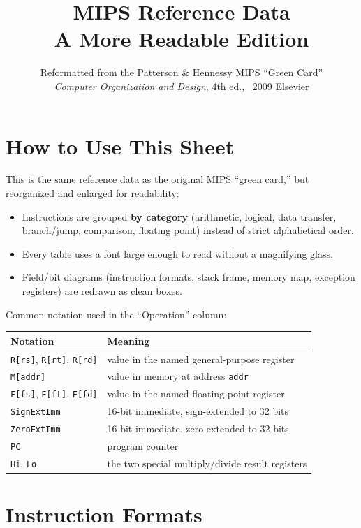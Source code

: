 \documentclass[10pt]{article}
\title{\bfseries MIPS Reference Data\\[2pt]\large A More Readable Edition}
\author{Reformatted from the Patterson \& Hennessy MIPS ``Green Card''\\
\emph{Computer Organization and Design}, 4th ed., \textcopyright\ 2009 Elsevier}
\date{}
\newcommand{\op}[1]{\texttt{#1}}
\begin{document}
\maketitle
\tableofcontents
\newpage

\section{How to Use This Sheet}

This is the same reference data as the original MIPS ``green card,'' but
reorganized and enlarged for readability:
\begin{itemize}
  \item Instructions are grouped \textbf{by category} (arithmetic, logical,
  data transfer, branch/jump, comparison, floating point) instead of strict
  alphabetical order.
  \item Every table uses a font large enough to read without a magnifying
  glass.
  \item Field/bit diagrams (instruction formats, stack frame, memory map,
  exception registers) are redrawn as clean boxes.
\end{itemize}

Common notation used in the ``Operation'' column:
\begin{center}
\begin{tabular}{@{}ll@{}}
\toprule
Notation & Meaning \\
\midrule
\op{R[rs]}, \op{R[rt]}, \op{R[rd]} & value in the named general-purpose register \\
\op{M[addr]} & value in memory at address \op{addr} \\
\op{F[fs]}, \op{F[ft]}, \op{F[fd]} & value in the named floating-point register \\
\op{SignExtImm} & 16-bit immediate, sign-extended to 32 bits \\
\op{ZeroExtImm} & 16-bit immediate, zero-extended to 32 bits \\
\op{PC} & program counter \\
\op{Hi}, \op{Lo} & the two special multiply/divide result registers \\
\bottomrule
\end{tabular}
\end{center}

\section{Instruction Formats}
\end{document}
